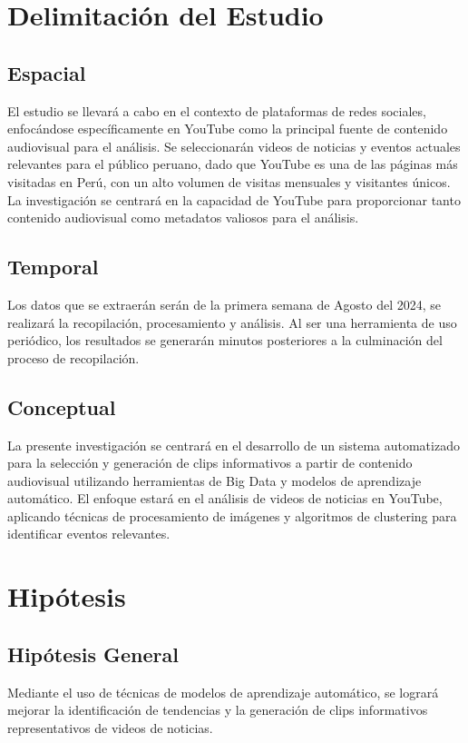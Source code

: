 \section{Delimitación del Estudio}

\subsection{Espacial}
El estudio se llevará a cabo en el contexto de plataformas de redes sociales, enfocándose específicamente en YouTube como la principal fuente de contenido audiovisual para el análisis. Se seleccionarán videos de noticias y eventos actuales relevantes para el público peruano, dado que YouTube es una de las páginas más visitadas en Perú, con un alto volumen de visitas mensuales y visitantes únicos. La investigación se centrará en la capacidad de YouTube para proporcionar tanto contenido audiovisual como metadatos valiosos para el análisis.
\subsection{Temporal}
Los datos que se extraerán serán de la primera semana de Agosto del 2024, se realizará la recopilación, procesamiento y análisis. Al ser una herramienta de uso periódico, los resultados se generarán minutos posteriores a la culminación del proceso de recopilación.
\subsection{Conceptual}
La presente investigación se centrará en el desarrollo de un sistema automatizado para la selección y generación de clips informativos a partir de contenido audiovisual utilizando herramientas de Big Data y modelos de aprendizaje automático. El enfoque estará en el análisis de videos de noticias en YouTube, aplicando técnicas de procesamiento de imágenes y algoritmos de clustering para identificar eventos relevantes.
\section{Hipótesis}

\subsection{Hipótesis General}
\newcommand{\HipotesisGeneral}{
	Mediante el uso de técnicas de modelos de aprendizaje automático, se logrará mejorar la identificación de tendencias y la generación de clips informativos representativos de videos de noticias.
}
\HipotesisGeneral

